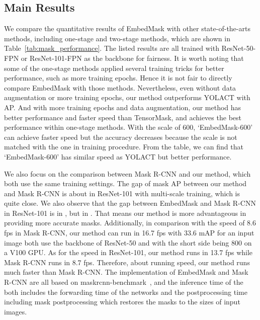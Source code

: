 \documentclass[10pt,twocolumn,letterpaper]{article}
\begin{document}
\subsection{Main Results}

\medbreak
{}
We compare the quantitative results of EmbedMask with other state-of-the-arts methods, including one-stage and two-stage methods, which are shown in Table~\ref{tab:mask_performance}. 
The listed results are all trained with ResNet-50-FPN or ResNet-101-FPN as the backbone for fairness. 
It is worth noting that some of the one-stage methods applied several training tricks for better performance, such as more training epochs. 
Hence it is not fair to directly compare EmbedMask with those methods. 
Nevertheless, even without data augmentation or more training epochs, our method outperforms YOLACT with  AP. 
And with more training epochs and data augmentation, our method has better performance and faster speed than TensorMask, and achieves the best performance within one-stage methods. 
With the scale of 600, `EmbedMask-600' can achieve faster speed but the accuracy decreases because the scale is not matched with the one in training procedure. 
From the table, we can find that `EmbedMask-600' has similar speed as YOLACT but better performance. 


We also focus on the comparison between Mask R-CNN and our method, which both use the same training settings. 
The gap of mask AP between our method and Mask R-CNN is about  in ResNet-101 with multi-scale training, which is quite close. 
We also observe that the gap between EmbedMask and Mask R-CNN in ResNet-101 is  in , but  in . 
That means our method is more advantageous in providing more accurate masks. 
Additionally, in comparison with the speed of 8.6 fps in Mask R-CNN, our method can run in 16.7 fps with 33.6 mAP for an input image both use the backbone of ResNet-50 and with the short side being 800 on a V100 GPU. 
As for the speed in ResNet-101, our method runs in 13.7 fps while Mask R-CNN runs in 8.7 fps. 
Therefore, about running speed, our method runs much faster than Mask R-CNN.
The implementation of EmbedMask and Mask R-CNN are all based on maskrcnn-benchmark~\cite{massa2018mrcnn}, and the inference time of the both includes the forwarding time of the networks and the postprocessing time including mask postprocessing which restores the masks to the sizes of input images.
\end{document}
